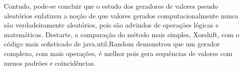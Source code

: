 Contudo, pode-se concluir que o estudo dos geradores de valores pseudo aleatórios enfatizou a noção de que valores gerados computacionalmente nunca são verdadeiramente aleatórios, pois são advindos de operações lógicas e matemáticas. Destarte, a comparação do método mais simples, Xorshift, com o código mais sofisticado de java.util.Random demonstrou que um gerador complexo, com mais operações, é melhor pois gera sequências de valores com menos padrões e coincidências.
